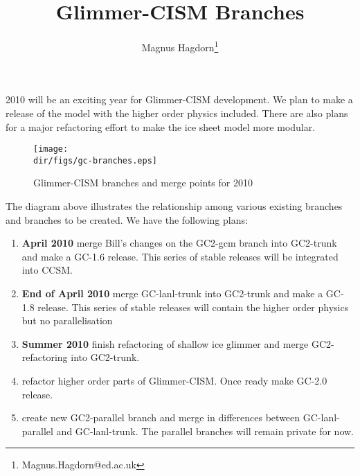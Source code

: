 \documentclass[10pt,english,a4paper]{article}
\newcommand{\dir}{.}
\begin{document}
\title{Glimmer-CISM Branches}
\author{Magnus Hagdorn\thanks{Magnus.Hagdorn@ed.ac.uk}}

\maketitle

2010 will be an exciting year for Glimmer-CISM development. We plan to make a release of the model with the higher order physics included. There are also plans for a major refactoring effort to make the ice sheet model more modular.

\begin{figure}[htbp]
\centering
\texttt{[image: \\dir/figs/gc-branches.eps]}
\caption{Glimmer-CISM branches and merge points for 2010}
\end{figure}

The diagram above illustrates the relationship among various existing branches and branches to be created. We have the following plans:
\begin{enumerate}
\item {\bf April 2010} merge Bill's changes on the GC2-gcm branch into GC2-trunk and make a GC-1.6 release. This series of stable releases will be integrated into CCSM.
\item {\bf End of April 2010} merge GC-lanl-trunk into GC2-trunk and make a GC-1.8 release. This series of stable releases will contain the higher order physics but no parallelisation
\item {\bf Summer 2010} finish refactoring of shallow ice glimmer and merge GC2-refactoring into GC2-trunk. 
\item refactor higher order parts of Glimmer-CISM. Once ready make GC-2.0 release.
\item create new GC2-parallel branch and merge in differences between GC-lanl-parallel and GC-lanl-trunk. The parallel branches will remain private for now.
\end{enumerate}
\end{document}
